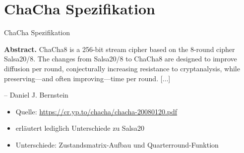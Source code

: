 \documentclass{beamer}
\begin{document}
\section{ChaCha Spezifikation}
\begin{frame}{ChaCha Spezifikation}

\begin{center}
\parbox{0.8\textwidth}{
\textbf{Abstract.} ChaCha8 is a 256-bit stream cipher based on the 8-round
cipher Salsa20/8. The changes from Salsa20/8 to ChaCha8 are designed
to improve diffusion per round, conjecturally increasing resistance to
cryptanalysis, while preserving—and often improving—time per round. [...]
\vspace{-0.75em}
\begin{flushright}
-- Daniel J. Bernstein
\end{flushright}
}
\end{center}
\begin{itemize}
\item Quelle: \url{https://cr.yp.to/chacha/chacha-20080120.pdf}
\item erläutert lediglich Unterschiede zu Salsa20
\item Unterschiede: Zustandsmatrix-Aufbau und Quarterround-Funktion
\end{itemize}
\end{frame}
\end{document}

